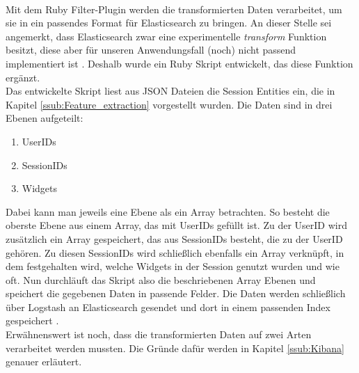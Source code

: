 \\
Mit dem Ruby Filter-Plugin werden die transformierten Daten verarbeitet, um sie in ein passendes Format für Elasticsearch zu bringen. An dieser Stelle sei angemerkt, dass Elasticsearch zwar eine experimentelle \textit{transform} Funktion besitzt, diese aber für unseren Anwendungsfall (noch) nicht passend implementiert ist \citep{ElTr20}. Deshalb wurde ein Ruby Skript entwickelt, das diese Funktion ergänzt.\\
Das entwickelte Skript liest aus JSON Dateien die Session Entities ein, die in Kapitel \ref{ssub:Feature_extraction} vorgestellt wurden.
Die Daten sind in drei Ebenen aufgeteilt:\\
\begin{enumerate}
	\item UserIDs
	\item SessionIDs
	\item Widgets
\end{enumerate}
Dabei kann man jeweils eine Ebene als ein Array betrachten. So besteht die oberste Ebene aus einem Array, das mit UserIDs gefüllt ist. Zu der UserID wird zusätzlich ein Array gespeichert, das aus SessionIDs besteht, die zu der UserID gehören. Zu diesen SessionIDs wird schließlich ebenfalls ein Array verknüpft, in dem festgehalten wird, welche Widgets in der Session genutzt wurden und wie oft. Nun durchläuft das Skript also die beschriebenen Array Ebenen und speichert die gegebenen Daten in passende Felder. Die Daten werden schließlich über Logstash an Elasticsearch gesendet und dort in einem passenden Index gespeichert \citep{Rub20}.\\
Erwähnenswert ist noch, dass die transformierten Daten auf zwei Arten verarbeitet werden mussten. Die Gründe dafür werden in Kapitel \ref{ssub:Kibana} genauer erläutert.

